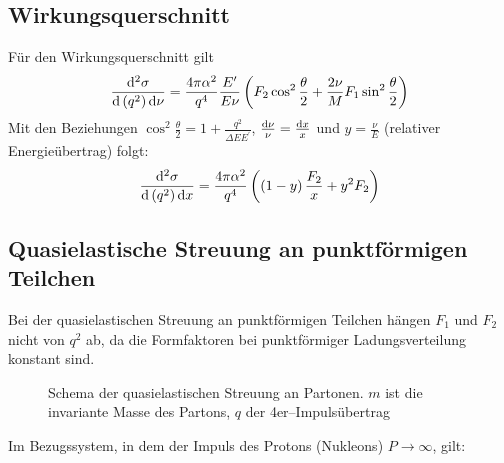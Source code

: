 \documentclass[Ex4_Zusammenfassung.tex]{subfiles}
\begin{document}
\subsection{Wirkungsquerschnitt}
Für den Wirkungsquerschnitt gilt
\begin{equation}
	\frac{\mathrm{d} ^2\sigma}{\mathrm{d} \left( q^2\right) \mathrm{d} \nu} = \frac{4 \pi \alpha^2}{q^4} \frac{E^\prime}{E\nu}\left( F_2 \cos^2 \frac{\theta}{2} + \frac{2\nu}{M}F_1\sin^2 \frac{\theta}{2} \right) 
\end{equation}
Mit den Beziehungen $\cos^2 \frac{\theta}{2} = 1 + \frac{q^2}{\Delta E E^\prime}$, $\frac{\mathrm{d} \nu}{\nu} = \frac{\mathrm{d} x}{x}$ und $y=\frac{\nu}{E}$ (relativer Energieübertrag) folgt:
\begin{equation}
	\frac{\mathrm{d} ^2 \sigma}{\mathrm{d} \left( q^2\right) \mathrm{d} x} = \frac{4\pi \alpha^2}{q^4} \left( \left( 1-y\right) \frac{F_2}{x} + y^2 F_2\right)
\end{equation}

\subsection{Quasielastische Streuung an punktförmigen Teilchen}
Bei der quasielastischen Streuung an punktförmigen Teilchen hängen $F_1$ und $F_2$ nicht von $q^2$ ab, da die Formfaktoren bei punktförmiger Ladungsverteilung konstant sind. 
\begin{figure}[H]
	\centering
	\caption{Schema der quasielastischen Streuung an Partonen. $m$ ist die invariante Masse des Partons, $q$ der 4er--Impulsübertrag}
\end{figure}
Im Bezugssystem, in dem der Impuls des Protons (Nukleons) $P \rightarrow \infty$, gilt:
\end{document}
